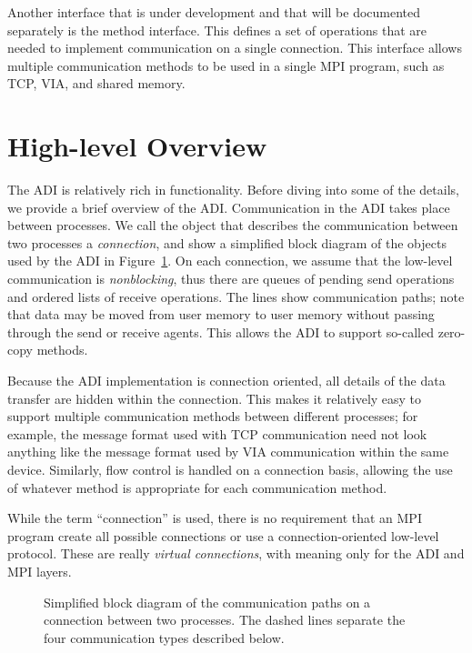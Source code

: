 Another interface that is under development and that will be
documented separately is the method interface.  This defines 
a set of operations that are needed to implement communication on a
single connection.  This interface allows multiple communication
methods to be used in a single MPI program, such as TCP, VIA, and
shared memory.  

\section{High-level Overview}
\label{sec:high-level}

The ADI is relatively rich in functionality.  Before diving into some of the
details, we provide a brief overview of the ADI.
Communication in the ADI takes place between processes.  We call the object
that describes the communication between two processes a
\emph{connection},
and show a simplified block diagram of the objects used by the ADI in
Figure~\ref{fig:adi-overview}.
On each connection, we assume that the low-level communication is
\emph{nonblocking}, thus there are queues of pending send operations and
ordered lists of receive operations.  The lines show communication paths; note
that data may be moved from user memory to user memory without passing through
the send or receive agents.  This allows the ADI to support so-called
zero-copy methods.

Because the ADI implementation is connection oriented, all details of the data
transfer are hidden within the connection.  This makes it relatively easy to
support multiple communication methods between different processes; for
example, the message format used with TCP communication need not look anything
like the message format used by VIA communication within the same device.
Similarly, flow control is handled on a connection basis, allowing the use of
whatever method is appropriate for each communication method.
%

While the term ``connection'' is used, there is no requirement that an MPI
program create all possible connections or use a connection-oriented low-level
protocol.  These are really \emph{virtual connections}, with meaning only for
the ADI and MPI layers.

\begin{figure}
\centerline{}
\caption{Simplified block diagram of the communication paths on a connection
  between two processes.  The dashed lines separate the four communication
  types described below.} 
\label{fig:adi-overview}
\end{figure}

